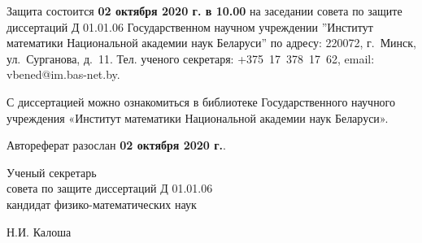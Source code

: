 \documentclass[_00_autoref.tex]{subfiles}
\begin{document}


\medskip

Защита состоится \textbf{02 октября 2020 г. в 10.00} на заседании совета по защите диссертаций Д 01.01.06 Государственном научном учреждении ''Институт математики Национальной академии наук Беларуси'' по адресу: 220072, г.~Минск, ул.~Сурганова, д.~11. Тел. ученого секретаря: +375~17~378~17~62, email: vbened@im.bas-net.by. 

\medskip

С диссертацией можно ознакомиться в библиотеке Государственного научного учреждения «Институт математики Национальной академии наук Беларуси».

\medskip
\noindent
Автореферат разослан \textbf{02 октября 2020 г.}.\\

\vfill
\noindent
\begin{minipage}[b]{0.6\textwidth}
\begin{flushleft}
Ученый секретарь \\
совета по защите диссертаций Д 01.01.06 \\
кандидат физико-математических наук
\end{flushleft}
\end{minipage}
\begin{minipage}[b]{0.39\textwidth}
\begin{flushright}
Н.И. Калоша 
\end{flushright}
\end{minipage}
\eject

\pagestyle{plain}
\setcounter{page}{1}
\setlength{\voffset}{-8mm}
\end{document}

